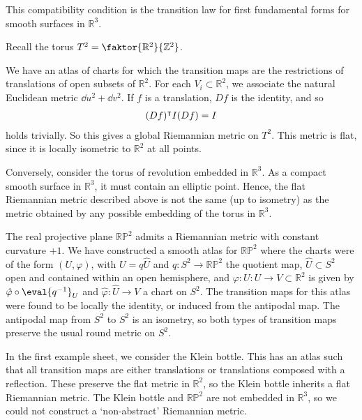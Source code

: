 This compatibility condition is the transition law for first fundamental forms for smooth surfaces in $\mathbb R^3$.
\begin{example}
	Recall the torus $T^2 = \faktor{\mathbb R^2}{\mathbb Z^2}$.
	\begin{center}
	\end{center}
	We have an atlas of charts for which the transition maps are the restrictions of translations of open subsets of $\mathbb R^2$.
	For each $V_i \subset \mathbb R^2$, we associate the natural Euclidean metric $\dd{u}^2 + \dd{v}^2$.
	If $f$ is a translation, $Df$ is the identity, and so
	\begin{align*}
		(Df)^\intercal I (Df) = I
	\end{align*}
	holds trivially.
	So this gives a global Riemannian metric on $T^2$.
	This metric is flat, since it is locally isometric to $\mathbb R^2$ at all points.

	Conversely, consider the torus of revolution embedded in $\mathbb R^3$.
	As a compact smooth surface in $\mathbb R^3$, it must contain an elliptic point.
	Hence, the flat Riemannian metric described above is not the same (up to isometry) as the metric obtained by any possible embedding of the torus in $\mathbb R^3$.

	The real projective plane $\mathbb R \mathbb P^2$ admits a Riemannian metric with constant curvature $+1$.
	We have constructed a smooth atlas for $\mathbb R \mathbb P^2$ where the charts were of the form $(U, \varphi)$, with $U = q \hat U$ and $q \colon S^2 \to \mathbb R \mathbb P^2$ the quotient map, $\hat U \subset S^2$ open and contained within an open hemisphere, and $\varphi \colon U \colon U \to V \subset \mathbb R^2$ is given by $\hat \varphi \circ \eval{q^{-1}}_U$ and $\hat \varphi \colon \hat U \to V$ a chart on $S^2$.
	The transition maps for this atlas were found to be locally the identity, or induced from the antipodal map.
	The antipodal map from $S^2$ to $S^2$ is an isometry, so both types of transition maps preserve the usual round metric on $S^2$.

	In the first example sheet, we consider the Klein bottle.
	This has an atlas such that all transition maps are either translations or translations composed with a reflection.
	These preserve the flat metric in $\mathbb R^2$, so the Klein bottle inherits a flat Riemannian metric.
	The Klein bottle and $\mathbb R \mathbb P^2$ are not embedded in $\mathbb R^3$, so we could not construct a `non-abstract' Riemannian metric.
\end{example}
